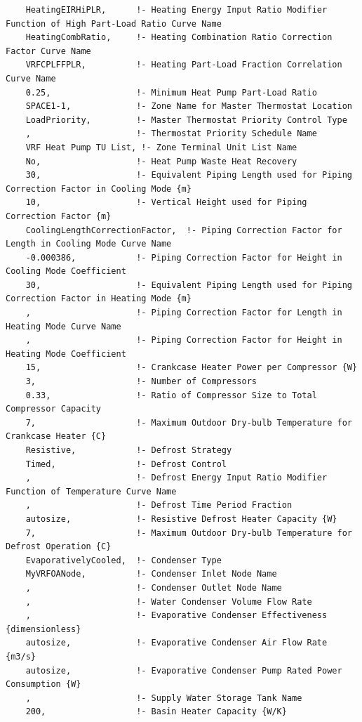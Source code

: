\begin{lstlisting}
    HeatingEIRHiPLR,      !- Heating Energy Input Ratio Modifier Function of High Part-Load Ratio Curve Name
    HeatingCombRatio,     !- Heating Combination Ratio Correction Factor Curve Name
    VRFCPLFFPLR,          !- Heating Part-Load Fraction Correlation Curve Name
    0.25,                 !- Minimum Heat Pump Part-Load Ratio
    SPACE1-1,             !- Zone Name for Master Thermostat Location
    LoadPriority,         !- Master Thermostat Priority Control Type
    ,                     !- Thermostat Priority Schedule Name
    VRF Heat Pump TU List, !- Zone Terminal Unit List Name
    No,                   !- Heat Pump Waste Heat Recovery
    30,                   !- Equivalent Piping Length used for Piping Correction Factor in Cooling Mode {m}
    10,                   !- Vertical Height used for Piping Correction Factor {m}
    CoolingLengthCorrectionFactor,  !- Piping Correction Factor for Length in Cooling Mode Curve Name
    -0.000386,            !- Piping Correction Factor for Height in Cooling Mode Coefficient
    30,                   !- Equivalent Piping Length used for Piping Correction Factor in Heating Mode {m}
    ,                     !- Piping Correction Factor for Length in Heating Mode Curve Name
    ,                     !- Piping Correction Factor for Height in Heating Mode Coefficient
    15,                   !- Crankcase Heater Power per Compressor {W}
    3,                    !- Number of Compressors
    0.33,                 !- Ratio of Compressor Size to Total Compressor Capacity
    7,                    !- Maximum Outdoor Dry-bulb Temperature for Crankcase Heater {C}
    Resistive,            !- Defrost Strategy
    Timed,                !- Defrost Control
    ,                     !- Defrost Energy Input Ratio Modifier Function of Temperature Curve Name
    ,                     !- Defrost Time Period Fraction
    autosize,             !- Resistive Defrost Heater Capacity {W}
    7,                    !- Maximum Outdoor Dry-bulb Temperature for Defrost Operation {C}
    EvaporativelyCooled,  !- Condenser Type
    MyVRFOANode,          !- Condenser Inlet Node Name
    ,                     !- Condenser Outlet Node Name
    ,                     !- Water Condenser Volume Flow Rate
    ,                     !- Evaporative Condenser Effectiveness {dimensionless}
    autosize,             !- Evaporative Condenser Air Flow Rate {m3/s}
    autosize,             !- Evaporative Condenser Pump Rated Power Consumption {W}
    ,                     !- Supply Water Storage Tank Name
    200,                  !- Basin Heater Capacity {W/K}

\end{lstlisting}
